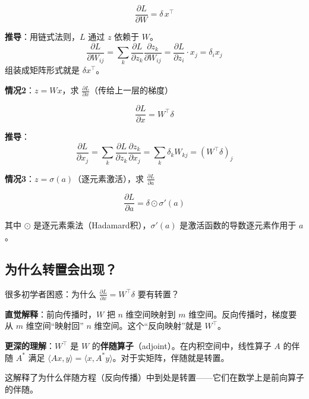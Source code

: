 \begin{equation}
\boxed{\frac{\partial L}{\partial W} = \delta \, x^\top}
\end{equation}

\textbf{推导}：用链式法则，$L$ 通过 $z$ 依赖于 $W$。
\begin{equation}
\frac{\partial L}{\partial W_{ij}} = \sum_k \frac{\partial L}{\partial z_k} \frac{\partial z_k}{\partial W_{ij}} = \frac{\partial L}{\partial z_i} \cdot x_j = \delta_i x_j
\end{equation}
组装成矩阵形式就是 $\delta x^\top$。

\textbf{情况2}：$z = Wx$，求 $\frac{\partial L}{\partial x}$（传给上一层的梯度）

\begin{equation}
\boxed{\frac{\partial L}{\partial x} = W^\top \delta}
\end{equation}

\textbf{推导}：
\begin{equation}
\frac{\partial L}{\partial x_j} = \sum_k \frac{\partial L}{\partial z_k} \frac{\partial z_k}{\partial x_j} = \sum_k \delta_k W_{kj} = (W^\top \delta)_j
\end{equation}

\textbf{情况3}：$z = \sigma(a)$（逐元素激活），求 $\frac{\partial L}{\partial a}$

\begin{equation}
\boxed{\frac{\partial L}{\partial a} = \delta \odot \sigma'(a)}
\end{equation}

其中 $\odot$ 是逐元素乘法（Hadamard积），$\sigma'(a)$ 是激活函数的导数逐元素作用于 $a$。

\subsection*{为什么转置会出现？}

很多初学者困惑：为什么 $\frac{\partial L}{\partial x} = W^\top \delta$ 要有转置？

\textbf{直觉解释}：前向传播时，$W$ 把 $n$ 维空间映射到 $m$ 维空间。反向传播时，梯度要从 $m$ 维空间``映射回'' $n$ 维空间。这个``反向映射''就是 $W^\top$。

\textbf{更深的理解}：$W^\top$ 是 $W$ 的\textbf{伴随算子}（adjoint）。在内积空间中，线性算子 $A$ 的伴随 $A^*$ 满足 $\langle Ax, y \rangle = \langle x, A^* y \rangle$。对于实矩阵，伴随就是转置。

这解释了为什么伴随方程（反向传播）中到处是转置——它们在数学上是前向算子的伴随。


